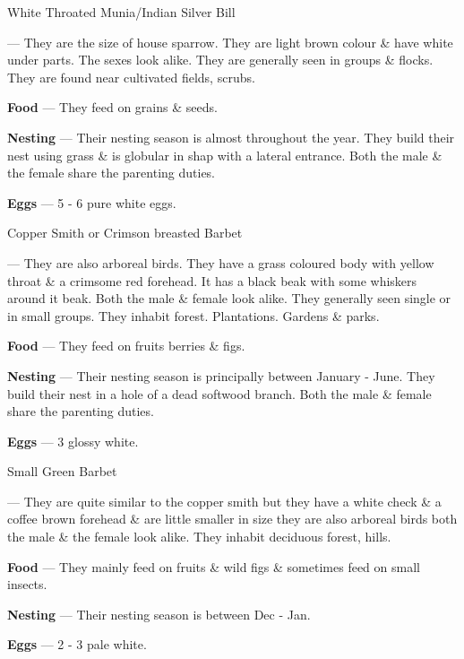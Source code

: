 \begin{bird}{White Throated Munia/Indian Silver Bill}

 --- They are the size of house sparrow. They are light brown colour \& have white under parts. The sexes look alike. They are generally seen in groups \& flocks. They are found near cultivated fields, scrubs. 

{\large\bf Food} --- They feed on grains \& seeds.

{\large\bf Nesting} --- Their nesting season is almost throughout the year. They build their nest using grass \& is globular in shap with a lateral entrance. Both the male \& the female share the parenting duties.

{\large\bf Eggs} --- 5 - 6 pure white eggs.
\end{bird}

\begin{bird}{Copper Smith or Crimson breasted Barbet}

 --- They are also arboreal birds. They have a grass coloured body with yellow throat \& a crimsome red forehead. It has a black beak with some whiskers around it beak. Both the male \& female look alike. They generally seen single or in small groups. They inhabit forest. Plantations. Gardens \& parks.

{\large\bf Food} --- They feed on fruits berries \& figs.

{\large\bf Nesting} --- Their nesting season is principally between January - June. They build their nest in a hole of a dead softwood branch. Both the male \& female share the parenting duties.

{\large\bf Eggs} --- 3 glossy white.
\end{bird}

\begin{bird}{Small Green Barbet}

 --- They are quite similar to the copper smith but they have a white check \& a coffee brown forehead \& are little smaller in size they are also arboreal birds both the male \& the female look alike. They inhabit deciduous forest, hills.

{\large\bf Food} --- They mainly feed on fruits \& wild figs \& sometimes feed on small insects.

{\large\bf Nesting} --- Their nesting season is between Dec - Jan.

{\large\bf Eggs} --- 2 - 3 pale white.
\end{bird}

